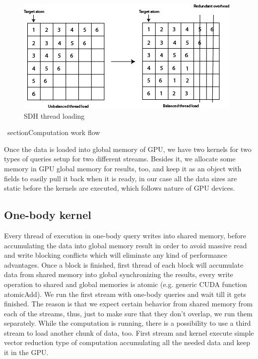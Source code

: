 \documentclass[11pt,a4paper]{report}
\begin{document}
\begin{figure}
 \centerline{ \includegraphics[width=0.5\columnwidth]{images/threadload} }
 \caption{SDH thread loading}
 \label{fg:threadload}
\end{figure}



\ section{Computation work flow}

Once the data is loaded into global memory of GPU, we have two kernels for two types of queries setup for two different streams. Besides it, we allocate some memory in GPU global memory for results, too, and keep it as an object with fields to easily pull it back when it is ready, in our case all the data sizes are static before the kernels are executed, which follows nature of GPU devices. 
\subsection{One-body kernel} Every thread of execution in one-body query writes into shared memory, before accumulating the data into global memory result in order to avoid massive read and write blocking conflicts which will eliminate any kind of performance advantages. Once a block is finished, first thread of each block will accumulate data from shared memory into global synchronizing the results, every write operation to shared and global memories is atomic (e.g. generic CUDA function atomicAdd). We run the first stream with one-body queries and wait till it gets finished. The reason is that we expect certain behavior from shared memory from each of the streams, thus, just to make sure that they don't overlap, we run them separately. While the computation is running, there is a possibility to use a third stream to load another chunk of data, too. First stream and kernel execute simple vector reduction type of computation accumulating all the needed data and keep it in the GPU.
\end{document}
